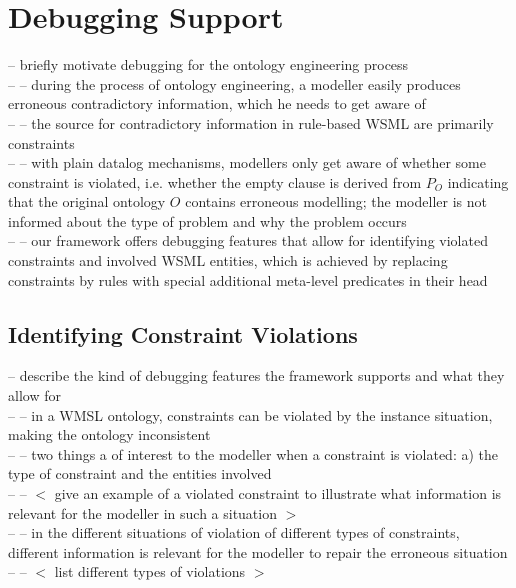 \def\transdebug{\transtxt{debug}}
\def\pvotype{\predicate{\predsubtxt{v\_otype}}}
\def\pvmincard{\predicate{\predsubtxt{v\_mincard}}}
\def\pvmaxcard{\predicate{\predsubtxt{v\_maxcard}}}
\def\pvuser{\predicate{\predsubtxt{v\_user}}}
\def\axiomid{\ensuremath{Ax_{I\!D}}}
\def\debugaxioms{\ensuremath{P_{\smtxtit{debug}}}\xspace}

\section{Debugging Support\label{sec:debugging}}
-- briefly motivate debugging for the ontology engineering process \\
-- -- during the process of ontology engineering, a modeller easily produces erroneous contradictory information, which he needs to get aware of \\
-- -- the source for contradictory information in rule-based WSML are primarily constraints \\
-- -- with plain datalog mechanisms, modellers only get aware of whether some constraint is violated, i.e. whether the empty clause is derived from $P_O$ indicating that the original ontology $O$ contains erroneous modelling; the modeller is not informed about the type of problem and why the problem occurs \\
-- -- our framework offers debugging features that allow for identifying violated constraints and involved WSML entities, which is achieved by replacing constraints by rules with special additional meta-level predicates in their head \\

\subsection{Identifying Constraint Violations}
-- describe the kind of debugging features the framework supports and what they allow for \\
-- -- in a WMSL ontology, constraints can be violated by the instance situation, making the ontology inconsistent \\
-- -- two things a of interest to the modeller when a constraint is violated: a) the type of constraint and the entities involved \\
-- -- $<$ give an example of a violated constraint to illustrate what information is relevant for the modeller in such a situation $>$ \\
-- -- in the different situations of violation of different types of constraints, different information is relevant for the modeller to repair the erroneous situation  \\
-- -- $<$ list different types of violations $>$ \\

